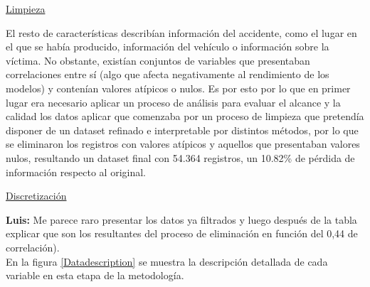 \documentclass{uathesis-es}
\begin{document}
\underline{Limpieza}
	
El resto de características describían información del accidente, como el lugar en el que se había producido, información del vehículo o información sobre la víctima. No obstante, existían conjuntos de variables que presentaban correlaciones entre sí (algo que afecta negativamente al rendimiento de los modelos) y contenían valores atípicos o nulos. Es por esto por lo que en primer lugar era necesario aplicar un proceso de análisis para evaluar el alcance y la calidad los datos aplicar que comenzaba por un proceso de limpieza que pretendía disponer de un dataset refinado e interpretable por distintos métodos, por lo que se eliminaron los registros con valores atípicos y aquellos que presentaban valores nulos, resultando un dataset final con 54.364 registros, un 10.82\% de pérdida de información respecto al original.


\underline{Discretización}

\textbf{Luis: } Me parece raro presentar los datos ya filtrados y luego después de la tabla explicar que son los resultantes del proceso de eliminación en función del 0,44 de correlación).\\


En la figura \ref{Datadescription} se muestra la descripción detallada de cada variable en esta etapa de la metodología.
\end{document}
